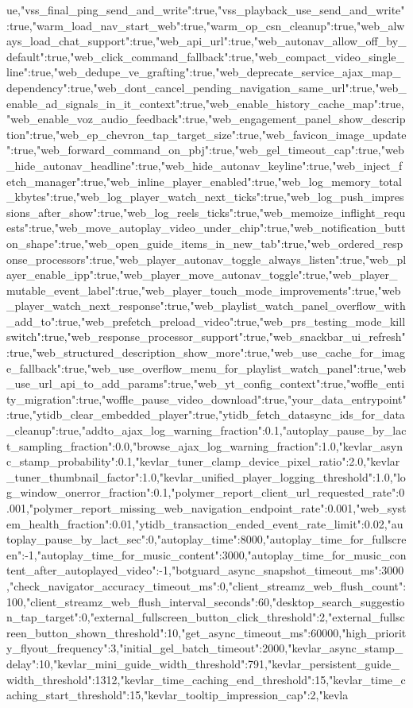 {ue,"vss_final_ping_send_and_write":true,"vss_playback_use_send_and_write":true,"warm_load_nav_start_web":true,"warm_op_csn_cleanup":true,"web_always_load_chat_support":true,"web_api_url":true,"web_autonav_allow_off_by_default":true,"web_click_command_fallback":true,"web_compact_video_single_line":true,"web_dedupe_ve_grafting":true,"web_deprecate_service_ajax_map_dependency":true,"web_dont_cancel_pending_navigation_same_url":true,"web_enable_ad_signals_in_it_context":true,"web_enable_history_cache_map":true,"web_enable_voz_audio_feedback":true,"web_engagement_panel_show_description":true,"web_ep_chevron_tap_target_size":true,"web_favicon_image_update":true,"web_forward_command_on_pbj":true,"web_gel_timeout_cap":true,"web_hide_autonav_headline":true,"web_hide_autonav_keyline":true,"web_inject_fetch_manager":true,"web_inline_player_enabled":true,"web_log_memory_total_kbytes":true,"web_log_player_watch_next_ticks":true,"web_log_push_impressions_after_show":true,"web_log_reels_ticks":true,"web_memoize_inflight_requests":true,"web_move_autoplay_video_under_chip":true,"web_notification_button_shape":true,"web_open_guide_items_in_new_tab":true,"web_ordered_response_processors":true,"web_player_autonav_toggle_always_listen":true,"web_player_enable_ipp":true,"web_player_move_autonav_toggle":true,"web_player_mutable_event_label":true,"web_player_touch_mode_improvements":true,"web_player_watch_next_response":true,"web_playlist_watch_panel_overflow_with_add_to":true,"web_prefetch_preload_video":true,"web_prs_testing_mode_killswitch":true,"web_response_processor_support":true,"web_snackbar_ui_refresh":true,"web_structured_description_show_more":true,"web_use_cache_for_image_fallback":true,"web_use_overflow_menu_for_playlist_watch_panel":true,"web_use_url_api_to_add_params":true,"web_yt_config_context":true,"woffle_entity_migration":true,"woffle_pause_video_download":true,"your_data_entrypoint":true,"ytidb_clear_embedded_player":true,"ytidb_fetch_datasync_ids_for_data_cleanup":true,"addto_ajax_log_warning_fraction":0.1,"autoplay_pause_by_lact_sampling_fraction":0.0,"browse_ajax_log_warning_fraction":1.0,"kevlar_async_stamp_probability":0.1,"kevlar_tuner_clamp_device_pixel_ratio":2.0,"kevlar_tuner_thumbnail_factor":1.0,"kevlar_unified_player_logging_threshold":1.0,"log_window_onerror_fraction":0.1,"polymer_report_client_url_requested_rate":0.001,"polymer_report_missing_web_navigation_endpoint_rate":0.001,"web_system_health_fraction":0.01,"ytidb_transaction_ended_event_rate_limit":0.02,"autoplay_pause_by_lact_sec":0,"autoplay_time":8000,"autoplay_time_for_fullscreen":-1,"autoplay_time_for_music_content":3000,"autoplay_time_for_music_content_after_autoplayed_video":-1,"botguard_async_snapshot_timeout_ms":3000,"check_navigator_accuracy_timeout_ms":0,"client_streamz_web_flush_count":100,"client_streamz_web_flush_interval_seconds":60,"desktop_search_suggestion_tap_target":0,"external_fullscreen_button_click_threshold":2,"external_fullscreen_button_shown_threshold":10,"get_async_timeout_ms":60000,"high_priority_flyout_frequency":3,"initial_gel_batch_timeout":2000,"kevlar_async_stamp_delay":10,"kevlar_mini_guide_width_threshold":791,"kevlar_persistent_guide_width_threshold":1312,"kevlar_time_caching_end_threshold":15,"kevlar_time_caching_start_threshold":15,"kevlar_tooltip_impression_cap":2,"kevla}

